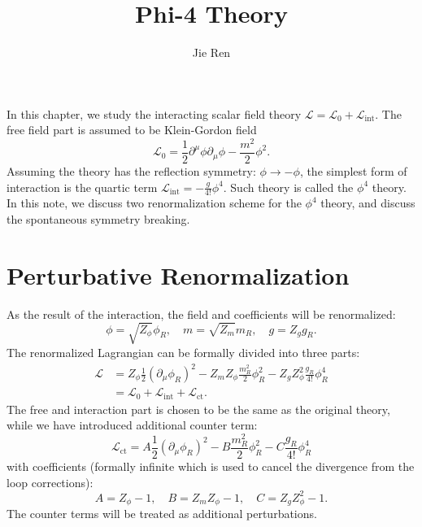 \documentclass[aps,prb,superscriptaddress,nofootinbib]{revtex4}
\begin{document}
\title{Phi-4 Theory}
\author{Jie Ren}


\maketitle



In this chapter, we study the interacting scalar field theory $\mathcal L = \mathcal L_0 + \mathcal L_{\mathrm{int}}$.
The free field part is assumed to be Klein-Gordon field 
\begin{equation}
	\mathcal L_0 =\frac{1}{2}\partial^\mu \phi \partial_\mu \phi -\frac{m^2}{2}\phi^2.
\end{equation}
Assuming the theory has the reflection symmetry: $\phi \rightarrow -\phi$, the simplest form of interaction is the quartic term $\mathcal L_{\mathrm{int}} = -\frac{g}{4!}\phi^4$.
Such theory is called the $\phi^4$ theory.
In this note, we discuss two renormalization scheme for the $\phi^4$ theory, and discuss the spontaneous symmetry breaking.


\tableofcontents



\section{Perturbative Renormalization}

As the result of the interaction, the field and coefficients will be renormalized:
\begin{equation}
	\phi = \sqrt{Z_\phi} \phi_R, \quad
	m = \sqrt{Z_m} m_R, \quad
	g = Z_g g_R.
\end{equation}
The renormalized Lagrangian can be formally divided into three parts: 
\begin{equation}
\begin{aligned}
	\mathcal{L} &= Z_\phi \frac{1}{2} (\partial_\mu\phi_R)^2 - Z_m Z_\phi \frac{m_R^2}{2} \phi_R^2 - Z_g Z_\phi^2 \frac{g_R}{4!}\phi_R^4 \\
	&= \mathcal L_0 + \mathcal L_{\mathrm{int}} + \mathcal L_{\mathrm{ct}}.
\end{aligned}
\end{equation}
The free and interaction part is chosen to be the same as the original theory, while we have introduced additional counter term:
\begin{equation}
	\mathcal L_{\mathrm{ct}} = A \frac{1}{2} (\partial_\mu\phi_R)^2 - B\frac{ m_R^2}{2} \phi_R^2 - C \frac{g_R}{4!} \phi_R^4
\end{equation}
with coefficients (formally infinite which is used to cancel the divergence from the loop corrections):
\begin{equation}
	A = Z_\phi-1, \quad 
	B = Z_m Z_\phi - 1, \quad 
	C = Z_g Z_\phi^2 - 1.
\end{equation}
The counter terms will be treated as additional perturbations.
\end{document}
